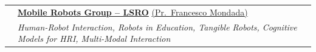 \begin{tabularx}{\textwidth}{@{}lX@{}}
            & \quad \href{http://www.mobots.epfl.ch}{\textbf{Mobile Robots Group -- LSRO}} \href{https://people.epfl.ch/francesco.mondada}{(Pr.\ Francesco Mondada)} \\
            & \quad \textit{Human-Robot Interaction, Robots in Education, Tangible Robots, Cognitive Models for HRI, Multi-Modal Interaction} \\
\end{tabularx}
